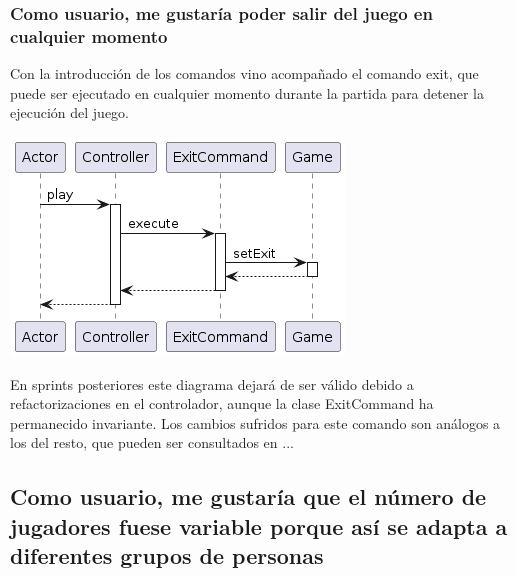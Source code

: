\documentclass[../DocumentoOficial.tex]{subfiles}
\begin{document}
\subsubsection{Como usuario, me gustaría poder salir del juego en cualquier momento}
\begin{sprint}[2]
Con la introducción de los comandos vino acompañado el comando exit, que puede ser ejecutado en cualquier momento durante la partida para detener la ejecución del juego.

\begin{center}
\includegraphics[scale=0.5]{exit-sprint2.png}
\end{center}

En sprints posteriores este diagrama dejará de ser válido debido a refactorizaciones en el controlador, aunque la clase ExitCommand ha permanecido invariante. Los cambios sufridos para este comando son análogos a los del resto, que pueden ser consultados en ... %
\end{sprint}

\subsection{Como usuario, me gustaría que el número de jugadores fuese variable porque así se adapta a diferentes grupos de personas}
\end{document}
